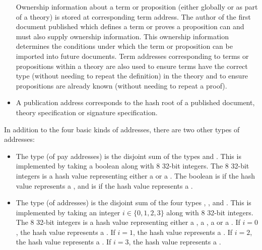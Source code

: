 \begin{itemize}
\begin{enumerate}
\end{enumerate}
Ownership information about a term or proposition (either globally or as part of a theory)
is stored at corresponding term address.
The author of the first document published which defines a term or proves a proposition can and must
also supply ownership information. This ownership information determines the conditions under
which the term or proposition can be imported into future documents.
Term addresses corresponding to terms or propositions within a theory are also used
to ensure terms have the correct type (without needing to repeat the definition) in the theory
and to ensure propositions are already known (without needing to repeat a proof).
\item {}
A publication address corresponds to the hash root of a published document, theory specification or signature specification.
\end{itemize}

In addition to the four basic kinds of addresses, there are two other types of addresses:
\begin{itemize}
\item {}
The type {} (of pay addresses) is the disjoint sum of the types {} and {}.
This is implemented by taking a boolean along with 8 32-bit integers.
The 8 32-bit integers is a hash value representing either a {}
or a {}.
The boolean is {} if the hash value represents a {},
and is {} if the hash value represents a {}.
\item {}
The type {} (of addresses) is the disjoint sum of the four types
{}, {},
{} and {}.
This is implemented by taking an integer $i\in\{0,1,2,3\}$ along with 8 32-bit integers.
The 8 32-bit integers is a hash value representing either a {}, a {},
a {} or a {}.
If $i=0$, the hash value represents a {}.
If $i=1$, the hash value represents a {}.
If $i=2$, the hash value represents a {}.
If $i=3$, the hash value represents a {}.
\end{itemize}

